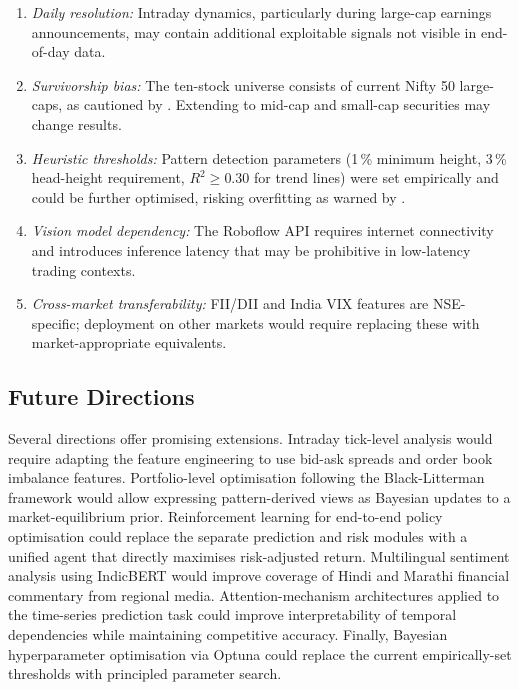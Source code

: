 \documentclass[ASNA,twocolumn]{USG}
\begin{document}
\begin{enumerate}[label=\arabic*., leftmargin=*, noitemsep]
  \item \emph{Daily resolution:} Intraday dynamics, particularly during
    large-cap earnings announcements, may contain additional exploitable
    signals not visible in end-of-day data.
  \item \emph{Survivorship bias:} The ten-stock universe consists
    of current Nifty 50 large-caps, as cautioned by \citet{elton1996}.
    Extending to mid-cap and small-cap securities may change results.
  \item \emph{Heuristic thresholds:} Pattern detection parameters
    (1\,\% minimum height, 3\,\% head-height requirement, $R^2 \geq 0.30$
    for trend lines) were set empirically and could be further optimised,
    risking overfitting as warned by \citet{white2000}.
  \item \emph{Vision model dependency:} The Roboflow API requires
    internet connectivity and introduces inference latency that may be
    prohibitive in low-latency trading contexts.
  \item \emph{Cross-market transferability:} FII/DII and India VIX
    features are NSE-specific; deployment on other markets would
    require replacing these with market-appropriate equivalents.
\end{enumerate}

\subsection{Future Directions}

Several directions offer promising extensions.
Intraday tick-level analysis would require adapting the feature engineering
to use bid-ask spreads and order book imbalance features.
Portfolio-level optimisation following the Black-Litterman framework
\citep{black1992} would allow expressing pattern-derived views as
Bayesian updates to a market-equilibrium prior.
Reinforcement learning for end-to-end policy optimisation
\citep{jiang2017} could replace the separate prediction and risk modules
with a unified agent that directly maximises risk-adjusted return.
Multilingual sentiment analysis using IndicBERT would improve coverage
of Hindi and Marathi financial commentary from regional media.
Attention-mechanism architectures \citep{vaswani2017} applied to the
time-series prediction task could improve interpretability of temporal
dependencies while maintaining competitive accuracy.
Finally, Bayesian hyperparameter optimisation via Optuna could replace
the current empirically-set thresholds with principled parameter search.
\end{document}
